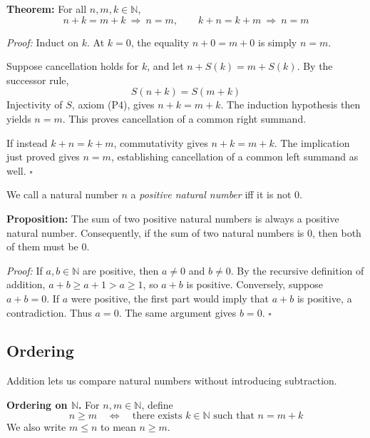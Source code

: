 \documentclass[a4paper,11pt,abstracton]{scrartcl}
\newcommand{\NN}{\mathbb{N}}
\newcommand{\rimply}{\Rightarrow}
\theoremstyle{dotlessP}
\theoremstyle{dotlessS}
\theoremstyle{remark}
\theoremstyle{definition}
\begin{document}
\begin{problem_box}
\textbf{Theorem:}
For all $n,m,k\in\NN$,
\[
    n+k=m+k\ \rimply\ n=m,
    \qquad k+n=k+m\ \rimply\ n=m
\]
\end{problem_box}

\begin{claim_box}
\textit{Proof:}
Induct on $k$. At $k=0$, the equality $n+0=m+0$ is simply $n=m$.

Suppose cancellation holds for $k$, and let
$n+S(k)=m+S(k)$. By the successor rule,
\[
    S(n+k)=S(m+k)
\]
Injectivity of $S$, axiom (P4), gives $n+k=m+k$.
The induction hypothesis then yields $n=m$. This proves cancellation
of a common right summand.

If instead $k+n=k+m$, commutativity gives $n+k=m+k$.
The implication just proved gives $n=m$, establishing cancellation
of a common left summand as well.
\hfill$\square$
\end{claim_box}

\begin{definition_box}
We call a natural number $n$ a \emph{positive natural number} iff it is not $0$.
\end{definition_box}

\begin{problem_box}
\textbf{Proposition:}
The sum of two positive natural numbers is always a positive natural number. Consequently, if the sum of two natural numbers is $0$, then both of them must be $0$.
\end{problem_box}

\textit{Proof:}
If $a,b\in\NN$ are positive, then $a\ne0$ and $b\ne0$. By the
recursive definition of addition, $a+b\ge a+1>a\ge1$, so $a+b$
is positive. Conversely, suppose $a+b=0$. If $a$ were positive,
the first part would imply that $a+b$ is positive, a contradiction.
Thus $a=0$. The same argument gives $b=0$.
\hfill$\square$

\subsection{Ordering}
\label{subsec:ordering}

Addition lets us compare natural numbers without introducing subtraction.

\begin{definition_box}
\textbf{Ordering on $\NN$.} For $n,m\in\NN$, define
\[
    n\ge m
    \quad\Longleftrightarrow\quad
    \text{there exists }k\in\NN\text{ such that }n=m+k
\]
We also write $m\le n$ to mean $n\ge m$.
\end{definition_box}
\end{document}
